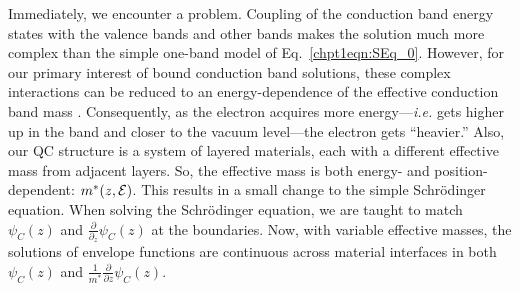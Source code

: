 \documentclass[12pt]{report}
\begin{document}
Immediately, we encounter a problem.  Coupling of the conduction band energy states with the valence bands and other bands makes the solution much more complex than the simple one-band model of Eq.~\eqref{chpt1eqn:SEq_0}.  However, for our primary interest of bound conduction band solutions, these complex interactions can be reduced to an energy-dependence of the effective conduction band mass \cite{Sirtori:PRB:1994}.  Consequently, as the electron acquires more energy---\emph{i.e.} gets higher up in the band and closer to the vacuum level---the electron gets ``heavier.''  Also, our QC structure is a system of layered materials, each with a different effective mass from adjacent layers.  So, the effective mass is both energy- and position-dependent: $m^*(z,\EE)$.  This results in a small change to the simple Schr\"{o}dinger equation.  When solving the Schr\"{o}dinger equation, we are taught to match $\psi_C(z)$ and $\frac{\partial}{\partial_z} \psi_C(z)$ at the boundaries.  Now, with variable effective masses, the solutions of envelope functions \cite{Harrison} are continuous across material interfaces in both $\psi_C(z)$ and $\frac{1}{m^*} \frac{\partial}{\partial z} \psi_C(z)$.
\end{document}
